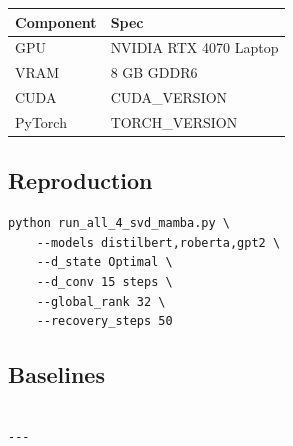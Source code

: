 \begin{table}[H]
\centering
\small
\begin{tabular}{ll}
\toprule
\textbf{Component} & \textbf{Spec} \\
\midrule
GPU & NVIDIA RTX 4070 Laptop \\
VRAM & 8 GB GDDR6 \\
CUDA & {{CUDA\_VERSION}} \\
PyTorch & {{TORCH\_VERSION}} \\
\bottomrule
\end{tabular}
\end{table}

\subsection{Reproduction}

\begin{lstlisting}
python run_all_4_svd_mamba.py \
    --models distilbert,roberta,gpt2 \
    --d_state Optimal \
    --d_conv 15 steps \
    --global_rank 32 \
    --recovery_steps 50
\end{lstlisting}

\subsection{Baselines}

\begin{lstlisting}

---
\end{lstlisting}